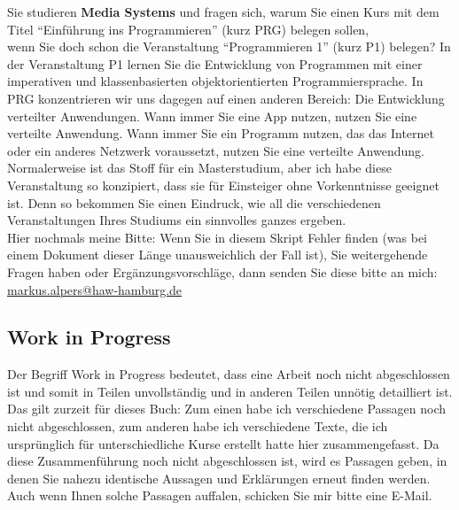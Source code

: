 Sie studieren \textbf{Media Systems} und fragen sich, warum Sie einen Kurs mit dem Titel "`Einführung ins Programmieren"' (kurz PRG) belegen sollen,\\
wenn Sie doch schon die Veranstaltung "`Programmieren 1"' (kurz P1) belegen? In der Veranstaltung P1 lernen Sie die Entwicklung von Programmen mit einer imperativen und klassenbasierten objektorientierten Programmiersprache. In PRG konzentrieren wir uns dagegen auf einen anderen Bereich: Die Entwicklung verteilter Anwendungen. Wann immer Sie eine App nutzen, nutzen Sie eine verteilte Anwendung. Wann immer Sie ein Programm nutzen, das das Internet oder ein anderes Netzwerk voraussetzt, nutzen Sie eine verteilte Anwendung. Normalerweise ist das Stoff für ein Masterstudium, aber ich habe diese Veranstaltung so konzipiert, dass sie für Einsteiger ohne Vorkenntnisse geeignet ist. Denn so bekommen Sie einen Eindruck, wie all die verschiedenen Veranstaltungen Ihres Studiums ein sinnvolles ganzes ergeben.\\

Hier nochmals meine Bitte: Wenn Sie in diesem Skript Fehler finden (was bei einem Dokument dieser Länge unausweichlich der Fall ist), Sie weitergehende Fragen haben oder Ergänzungsvorschläge, dann senden Sie diese bitte an mich: \url{markus.alpers@haw-hamburg.de}

\subsection*{Work in Progress}

Der Begriff Work in Progress bedeutet, dass eine Arbeit noch nicht abgeschlossen ist und somit in Teilen unvollständig und in anderen Teilen unnötig detailliert ist. Das gilt zurzeit für dieses Buch: Zum einen habe ich verschiedene Passagen noch nicht abgeschlossen, zum anderen habe ich verschiedene Texte, die ich ursprünglich für unterschiedliche Kurse erstellt hatte hier zusammengefasst. Da diese Zusammenführung noch nicht abgeschlossen ist, wird es Passagen geben, in denen Sie nahezu identische Aussagen und Erklärungen erneut finden werden. Auch wenn Ihnen solche Passagen auffalen, schicken Sie mir bitte eine E-Mail.
